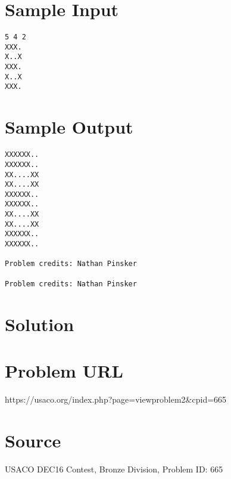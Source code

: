 \documentclass[12pt]{article}
\begin{document}
\section*{Sample Input}
\begin{verbatim}
5 4 2
XXX.
X..X
XXX.
X..X
XXX.
\end{verbatim}

\section*{Sample Output}
\begin{verbatim}
XXXXXX..
XXXXXX..
XX....XX
XX....XX
XXXXXX..
XXXXXX..
XX....XX
XX....XX
XXXXXX..
XXXXXX..

Problem credits: Nathan Pinsker

Problem credits: Nathan Pinsker
\end{verbatim}

\section*{Solution}


\section*{Problem URL}
https://usaco.org/index.php?page=viewproblem2&cpid=665

\section*{Source}
USACO DEC16 Contest, Bronze Division, Problem ID: 665
\end{document}
